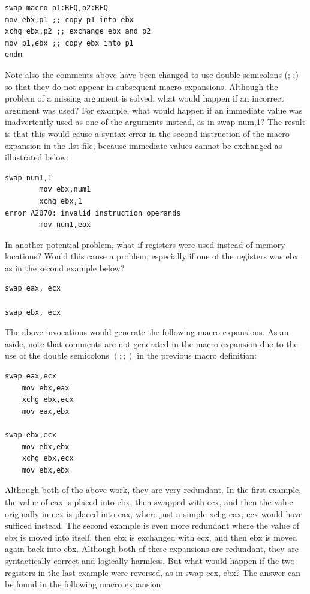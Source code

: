 \documentclass[10pt]{book}
\begin{document}
\begin{verbatim}
swap macro p1:REQ,p2:REQ
mov ebx,p1 ;; copy p1 into ebx
xchg ebx,p2 ;; exchange ebx and p2
mov p1,ebx ;; copy ebx into p1
endm
\end{verbatim}

Note also the comments above have been changed to use double semicolons (; ;) so that they do not appear in subsequent macro expansions. Although the problem of a missing argument is solved, what would happen if an incorrect argument was used? For example, what would happen if an immediate value was inadvertently used as one of the arguments instead, as in swap num,1? The result is that this would cause a syntax error in the second instruction of the macro expansion in the .lst file, because immediate values cannot be exchanged as illustrated below:
\begin{verbatim}
swap num1,1
        mov ebx,num1
        xchg ebx,1
error A2070: invalid instruction operands
        mov num1,ebx
\end{verbatim}

In another potential problem, what if registers were used instead of memory locations? Would this cause a problem, especially if one of the registers was ebx as in the second example below?

\begin{verbatim}
swap eax, ecx

swap ebx, ecx
\end{verbatim}

The above invocations would generate the following macro expansions. As an aside, note that comments are not generated in the macro expansion due to the use of the double semicolons $(; ;)$ in the previous macro definition:

\begin{verbatim}
swap eax,ecx
    mov ebx,eax
    xchg ebx,ecx
    mov eax,ebx

swap ebx,ecx
    mov ebx,ebx
    xchg ebx,ecx
    mov ebx,ebx
\end{verbatim}

Although both of the above work, they are very redundant. In the first example, the value of eax is placed into ebx, then swapped with ecx, and then the value originally in ecx is placed into eax, where just a simple xchg eax, ecx would have sufficed instead. The second example is even more redundant where the value of ebx is moved into itself, then ebx is exchanged with ecx, and then ebx is moved again back into ebx. Although both of these expansions are redundant, they are syntactically correct and logically harmless. But what would happen if the two registers in the last example were reversed, as in swap ecx, ebx? The answer can be found in the following macro expansion:
\end{document}

